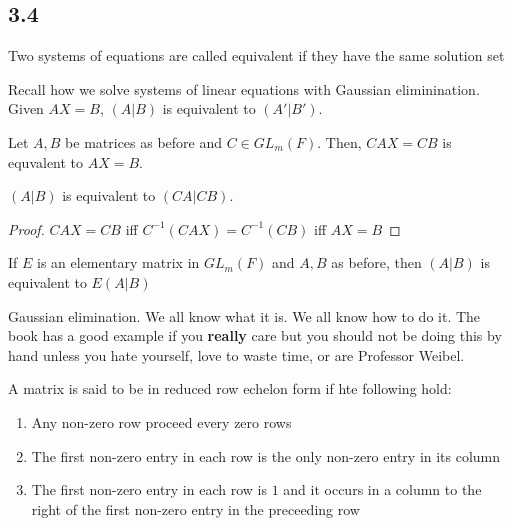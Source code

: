 \documentclass[12pt, letterpaper]{article}
\begin{document}
  \subsection*{3.4}
  \begin{definition}
    Two systems of equations are called equivalent if they have the same solution set
  \end{definition}
  Recall how we solve systems of linear equations with Gaussian eliminination.
  Given $AX=B$, $(A|B)$ is equivalent to $(A'|B')$.
  \begin{theorem}[Insel 3.13]
    Let $A,B$ be matrices as before and $C \in GL_m(F)$.
    Then, $CAX = CB$ is equvalent to $AX = B$.
    \begin{remark}
      $(A|B)$ is equivalent to $(CA|CB)$.
    \end{remark}
    \begin{proof}
      $CAX = CB$ iff $C^{-1}(CAX) = C^{-1}(CB)$ iff $AX = B$
    \end{proof}
  \end{theorem}
  \begin{corollary}
    If $E$ is an elementary matrix in $GL_m(F)$ and $A,B$ as before, then $(A|B)$ is equivalent to $E(A|B)$
  \end{corollary}
  \begin{definition}
    Gaussian elimination. We all know what it is. We all know how to do it. The book has a good example if you \textbf{really} care but you should not be doing this by hand unless you hate yourself, love to waste time, or are Professor Weibel.
  \end{definition}
  \begin{definition}
    A matrix is said to be in reduced row echelon form if hte following hold:
    \begin{enumerate}
      \item Any non-zero row proceed every zero rows
      \item The first non-zero entry in each row is the only non-zero entry in its column
      \item The first non-zero entry in each row is $1$ and it occurs in a column to the right of the first non-zero entry in the preceeding row
    \end{enumerate}
  \end{definition}
\end{document}
